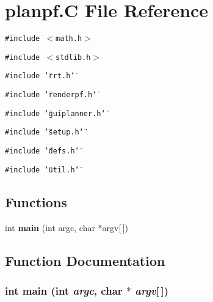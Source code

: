 \section{planpf.C File Reference}
\label{planpf_C}
{\tt \#include $<$math.h$>$}\par
{\tt \#include $<$stdlib.h$>$}\par
{\tt \#include \char`\"{}rrt.h\char`\"{}}\par
{\tt \#include \char`\"{}renderpf.h\char`\"{}}\par
{\tt \#include \char`\"{}guiplanner.h\char`\"{}}\par
{\tt \#include \char`\"{}setup.h\char`\"{}}\par
{\tt \#include \char`\"{}defs.h\char`\"{}}\par
{\tt \#include \char`\"{}util.h\char`\"{}}\par
\subsection*{Functions}
\begin{CompactItemize}
\item 
int {\bf main} (int argc, char $\ast$argv[$\,$])
\end{CompactItemize}


\subsection{Function Documentation}
\subsubsection{\setlength{\rightskip}{0pt plus 5cm}int main (int {\em argc}, char $\ast$ {\em argv}[$\,$])}\label{planpf_C_a0}


